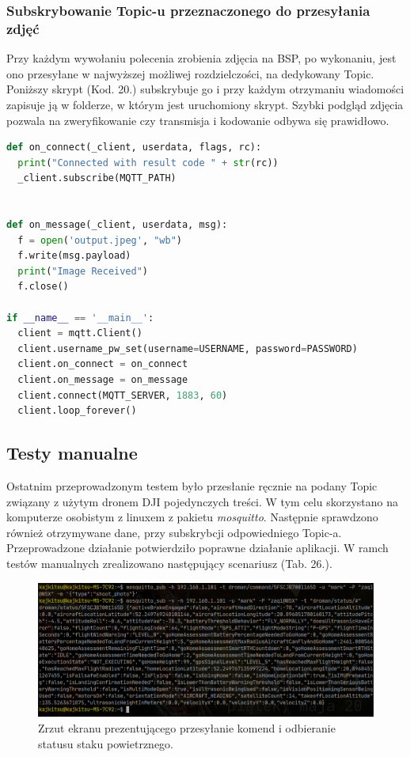 \subsubsection{Subskrybowanie Topic-u przeznaczonego do przesyłania zdjęć}

Przy każdym wywołaniu polecenia zrobienia zdjęcia na BSP, po wykonaniu, jest ono przesyłane w najwyższej możliwej rozdzielczości, na dedykowany Topic. Poniższy skrypt (Kod. 20.) subskrybuje go i przy każdym otrzymaniu wiadomości zapisuje ją w folderze, w którym jest uruchomiony skrypt. Szybki podgląd zdjęcia pozwala na zweryfikowanie czy transmisja i kodowanie odbywa się prawidłowo.


\begin{lstlisting}[language=Python, caption=Skrypt nasuchujący na podanym topicu MQTT i zapisujący dane z wiadomości MQTT w formacie /text{jpeg}]
def on_connect(_client, userdata, flags, rc):
  print("Connected with result code " + str(rc))
  _client.subscribe(MQTT_PATH)


def on_message(_client, userdata, msg):
  f = open('output.jpeg', "wb")
  f.write(msg.payload)
  print("Image Received")
  f.close()

if __name__ == '__main__':
  client = mqtt.Client()
  client.username_pw_set(username=USERNAME, password=PASSWORD)
  client.on_connect = on_connect
  client.on_message = on_message
  client.connect(MQTT_SERVER, 1883, 60)
  client.loop_forever()

\end{lstlisting}

\newpage
\subsection{Testy manualne}
Ostatnim przeprowadzonym testem było przesłanie ręcznie na podany Topic związany z użytym dronem DJI pojedynczych treści. W tym celu skorzystano na komputerze osobistym z linuxem z pakietu \textit{mosquitto}. Następnie sprawdzono również otrzymywane dane, przy subskrybcji odpowiedniego Topic-a. Przeprowadzone działanie potwierdziło poprawne działanie aplikacji.
W ramch testów manualnych zrealizowano następujący scenariusz (Tab. 26.).

\begin{figure}[!ht]
\begin{center}
  \includegraphics[width=15cm]{./Obrazy/exece.png}
  \caption{Zrzut ekranu prezentującego przesyłanie komend i odbieranie statusu staku powietrznego.}
  \end{center}
\end{figure}


